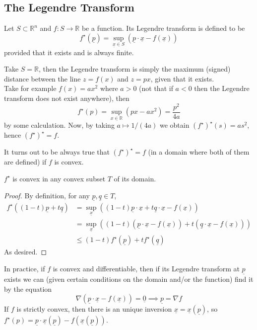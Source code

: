 \subsection{The Legendre Transform}
\begin{definition}
    Let $S\subset\mathbb R^n$ and $f:S\to\mathbb R$ be a function.
    Its Legendre transform is defined to be
    $$f^\star(\underline{p})=\sup_{\underline{x}\in S}(\underline{p}\cdot\underline{x}-f(\underline{x}))$$
    provided that it exists and is always finite.
\end{definition}
\begin{example}
    Take $S=\mathbb R$, then the Legendre transform is simply the maximum (signed) distance between the line $z=f(x)$ and $z=px$, given that it exists.\\
    Take for example $f(x)=ax^2$ where $a>0$ (not that if $a<0$ then the Legendre transform does not exist anywhere), then
    $$f^\star(p)=\sup_{x\in\mathbb R}(px-ax^2)=\frac{p^2}{4a}$$
    by some calculation.
    Now, by taking $a\mapsto 1/(4a)$ we obtain $(f^\star)^\star(s)=as^2$, hence $(f^\star)^\star=f$.
\end{example}
It turns out to be always true that $(f^\star)^\star=f$ (in a domain where both of them are defined) if $f$ is convex.
\begin{proposition}
    $f^\star$ is convex in any convex subset $T$ of its domain.
\end{proposition}
\begin{proof}
    By definition, for any $\underline{p},\underline{q}\in T$,
    \begin{align*}
        f^\star((1-t)\underline{p}+t\underline{q})&=\sup_{\underline{x}}((1-t)\underline{p}\cdot\underline{x}+t\underline{q}\cdot\underline{x}-f(\underline{x}))\\
        &=\sup_{\underline{x}}((1-t)(\underline{p}\cdot\underline{x}-f(\underline{x}))+t(\underline{q}\cdot\underline{x}-f(\underline{x})))\\
        &\le (1-t)f^{\star}(\underline{p})+tf^\star(\underline{q})
    \end{align*}
    As desired.
\end{proof}
In practice, if $f$ is convex and differentiable, then if its Legendre transform at $\underline{p}$ exists we can (given certain conditions on the domain and/or the function) find it by the equation
$$\nabla(\underline{p}\cdot\underline{x}-f(\underline{x}))=\underline{0}\implies \underline{p}=\nabla f$$
If $f$ is strictly convex, then there is an unique inversion $\underline{x}=\underline{x}(\underline{p})$, so $f^\star(p)=\underline{p}\cdot\underline{x}(\underline{p})-f(\underline{x}(\underline{p}))$.
